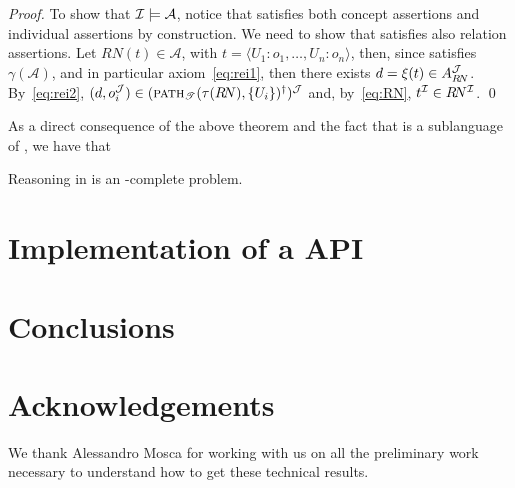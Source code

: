 \documentclass[envcountsame,draft]{llncs}
\newcommand{\pth}[2]{\ensuremath{\textsc{path}_{\mathscr{T}}(#1,#2)}\xspace}
\newcommand{\A}{\ensuremath{\mathcal{A}}\xspace}
\begin{document}
\begin{proof}
To show that $\Imc\models\A$, notice that \Imc satisfies both concept
assertions and individual assertions by construction. We need to show
that \Imc satisfies also relation assertions. Let $R\!N(t)\in\A$, with
$t=\langle U_1\!:\!o_1,\ldots,U_n\!:\!o_n\rangle$,
then, since \Jmc satisfies $\gamma(\A)$, and in particular
axiom~\eqref{eq:rei1}, then there exists $d = \xi(t) \in
A_{R\!N}^\mathcal{J}$. By~\eqref{eq:rei2}, $(d,o_i^\Jmc)\in
(\pth{\tau(R\!N)}{\{U_i\}}^\dag)^\Jmc$ and, by~\eqref{eq:RN},
$t^\mathcal{I}\in R\!N^\mathcal{I}$.
\hfill\qed

\end{proof}

As a direct consequence of the above theorem and the fact that \DLR is a sublanguage of \DLRpm, we have that

\begin{corollary}
  Reasoning in \DLRpm is an \ExpTime-complete problem.
\end{corollary}


\section{Implementation of a \DLRpm API}

\section{Conclusions}


\section{Acknowledgements}
We thank Alessandro Mosca for working with us on all the preliminary work necessary to understand how to get these technical results.




\end{document}

